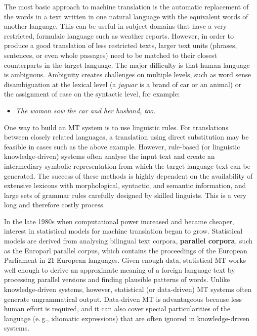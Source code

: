 \begin{multicols}{2}

The most basic approach to machine translation is the automatic replacement of the words in a text written in one natural language with the equivalent words of another language. This can be useful in subject domains that have a very restricted, formulaic language such as weather reports.
However, in order to produce a good translation of less restricted texts, larger text units (phrases, sentences, or even whole passages) need to be matched to their closest counterparts in the target language. The major difficulty is that human language is ambiguous. Ambiguity creates challenges on multiple levels, such as word sense disambiguation at the lexical level (a \textit{jaguar} is a brand of car or an animal) or the assignment of case on the syntactic level, for example:

\begin{itemize}
\item {\it The woman saw the car and her husband, too.}
\end{itemize}

One way to build an MT system is to use linguistic rules. For translations between closely related languages, a translation using direct substitution may be feasible in cases such as the above example. However, rule-based (or linguistic knowledge-driven) systems often analyse the input text and create an intermediary symbolic representation from which the target language text can be generated. The success of these methods is highly dependent on the availability of extensive lexicons with morphological, syntactic, and semantic information, and large sets of grammar rules carefully designed by skilled linguists. This is a very long and therefore costly process.

In the late 1980s when computational power increased and became cheaper, interest in statistical models for machine translation began to grow. Statistical models are derived from analysing bilingual text corpora, \textbf{parallel corpora}, such as the Europarl parallel corpus, which contains the proceedings of the European Parliament in 21 European languages. Given enough data, statistical MT works well enough to derive an approximate meaning of a foreign language text by processing parallel versions and finding plausible patterns of words. Unlike knowledge-driven systems, however, statistical (or data-driven) MT systems often generate ungrammatical output. Data-driven MT is advantageous because less human effort is required, and it can also cover special particularities of the language (e.\,g., idiomatic expressions) that are often ignored in knowledge-driven systems. 


\end{multicols}
